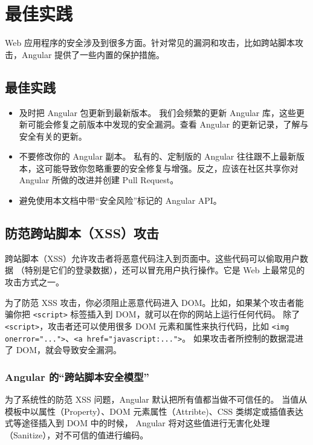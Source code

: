 \documentclass{progbookcn}
\begin{document}
\chapter{最佳实践}

Web 应用程序的安全涉及到很多方面。针对常见的漏洞和攻击，比如跨站脚本攻击，Angular 提供了一些内置的保护措施。

\section{最佳实践}

\begin{itemize}
  \item 及时把 Angular 包更新到最新版本。 我们会频繁的更新 Angular 库，这些更新可能会修复之前版本中发现的安全漏洞。查看 Angular 的更新记录，了解与安全有关的更新。
  \item 不要修改你的 Angular 副本。 私有的、定制版的 Angular 往往跟不上最新版本，这可能导致你忽略重要的安全修复与增强。反之，应该在社区共享你对 Angular 所做的改进并创建 Pull Request。
  \item 避免使用本文档中带``安全风险''标记的 Angular API。
\end{itemize}

\section{防范跨站脚本（XSS）攻击}

跨站脚本（XSS）允许攻击者将恶意代码注入到页面中。这些代码可以偷取用户数据 （特别是它们的登录数据），还可以冒充用户执行操作。它是 Web 上最常见的攻击方式之一。

为了防范 XSS 攻击，你必须阻止恶意代码进入 DOM。比如，如果某个攻击者能骗你把 \verb|<script>| 标签插入到 DOM，就可以在你的网站上运行任何代码。 除了 \verb|<script>|，攻击者还可以使用很多 DOM 元素和属性来执行代码，比如 \verb|<img onerror="...">|、\verb|<a href="javascript:...">|。 如果攻击者所控制的数据混进了 DOM，就会导致安全漏洞。

\subsection{Angular 的``跨站脚本安全模型''}

为了系统性的防范 XSS 问题，Angular 默认把所有值都当做不可信任的。 当值从模板中以属性（Property）、DOM 元素属性（Attribte)、CSS 类绑定或插值表达式等途径插入到 DOM 中的时候， Angular 将对这些值进行无害化处理（Sanitize），对不可信的值进行编码。
\end{document}

